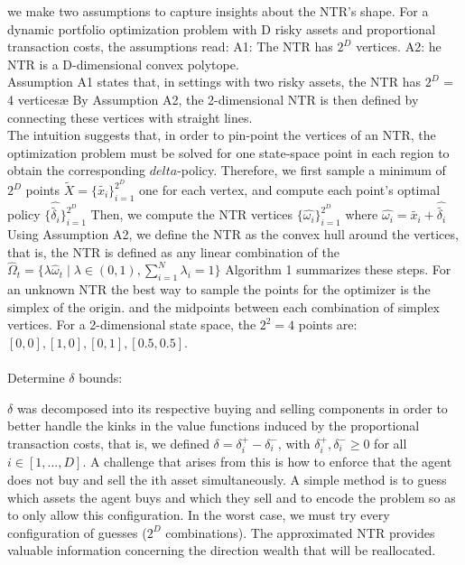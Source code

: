\documentclass[10pt,a4paper]{article}
\numberwithin{equation}{section} %
\begin{document}
we make two assumptions to capture insights about
the NTR’s shape. For a dynamic portfolio optimization problem with D risky assets
and proportional transaction costs, the assumptions read: A1: The NTR has $2^D$ vertices. A2: he NTR is a D-dimensional convex polytope.\\
Assumption A1 states that, in settings with two risky assets, the NTR has $2^D$ = 4
verticesæ By Assumption A2, the 2-dimensional NTR is then
defined by connecting these vertices with straight lines.\\
The intuition suggests that, in order to pin-point the vertices
of an NTR, the optimization problem must be solved for one
state-space point in each region to obtain the corresponding $delta$-policy.
Therefore, we first sample a minimum of $2^D$ points $\tilde{X} = \{ \tilde{ x_i } \}^{2^D}_{i=1} $
one for each vertex,
and compute each point’s optimal policy $ \{ \hat{\tilde{ \delta_i }} \}^{2^D}_{i=1} $
Then, we compute the NTR vertices
$ \{ \hat{ \omega_i } \}^{2^D}_{i=1} $ where $ \hat{ \omega_i } = \tilde{ x_i } + \hat{\tilde{ \delta_i }} $ Using Assumption A2, we define the NTR as the convex
hull around the vertices, that is, the NTR is defined as any linear combination of the
$\hat{\Omega}_t = \{ \lambda  \hat{ \omega}_t \mid \lambda \in (0,1), \sum^{N}_{i=1} \lambda_i = 1  \}$
Algorithm 1 summarizes these steps.
For an unknown NTR the best way to sample the points for the optimizer is the simplex of the origin. 
and the midpoints between each combination of simplex vertices. 
For a 2-dimensional state space, the $2^2 = 4$ points are: $[0,0], [1,0], [0,1] , [0.5 , 0.5]$.\\~\\

Determine $\delta$ bounds:

$\delta$ was decomposed
into its respective buying and selling components in order to better handle the kinks in
the value functions induced by the proportional transaction costs, that is, we defined
$\delta= \delta^+_i - \delta^-_i$, with $\delta^+_i , \delta^-_i \geq 0$ for all $i \in [1, ..., D]$. A challenge that arises from this
is how to enforce that the agent does not buy and sell the ith asset simultaneously.
A simple method is to guess which assets the agent buys and which they sell and to
encode the problem so as to only allow this configuration. In the worst case, we must
try every configuration of guesses ($2^D$ combinations). The approximated NTR provides
valuable information concerning the direction wealth that will be reallocated.
\end{document}
